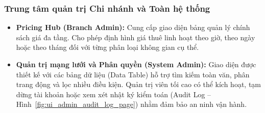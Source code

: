 \subsubsection{Trung tâm quản trị Chi nhánh và Toàn hệ thống}

\begin{itemize}
    \item \textbf{Pricing Hub (Branch Admin):} Cung cấp giao diện bảng quản lý chính sách giá đa tầng. Cho phép định hình giá thuê linh hoạt theo giờ, theo ngày hoặc theo tháng đối với từng phân loại không gian cụ thể.
    \item \textbf{Quản trị mạng lưới và Phân quyền (System Admin):} Giao diện được thiết kế với các bảng dữ liệu (Data Table) hỗ trợ tìm kiếm toàn văn, phân trang động và lọc nhiều điều kiện. Quản trị viên tối cao có thể kích hoạt, tạm dừng tài khoản hoặc xem xét nhật ký kiểm toán (Audit Log -- Hình~\ref{fig:ui_admin_audit_log_page}) nhằm đảm bảo an ninh vận hành.
\end{itemize}